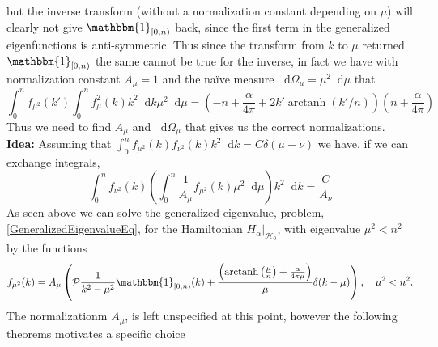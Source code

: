 \documentclass[a4paper,11pt]{article}
\DeclareMathOperator\arctanh{arctanh}
\newcommand*\diff{\mathop{}\!\mathrm{d}}
\numberwithin{equation}{section}
\begin{document}
	but the inverse transform (without a normalization constant depending on $ \mu $) will clearly not give $ \mathbbm{1}_{[0,n)} $ back, since the first term in the generalized eigenfunctions is anti-symmetric. Thus since the transform from $ k $ to $ \mu $ returned $ \mathbbm{1}_{[0,n)} $ the same cannot be true for the inverse, in fact we have with normalization constant $ A_\mu=1 $ and the na\"ive measure $ \diff\Omega_\mu=\mu^2\diff\mu $ that  \begin{equation}
	\int_{0}^{n}f_{\mu^2}(k')\int_{0}^{n}f_\mu^2(k) k^2\diff k\mu^2\diff\mu=\left(-n+\frac{\alpha}{4\pi}+2k'\arctanh(k'/n)\right)\left(n+\frac{\alpha}{4\pi}\right)
	\end{equation} 
	Thus we need to find $ A_\mu $ and $ \diff\Omega_\mu $ that gives us the correct normalizations.\\
	\textbf{Idea:} Assuming that $ \int_{0}^{n}f_{\mu^2}(k)f_{\nu^2}(k)k^2\diff k=C\delta(\mu-\nu) $ we have, if we can exchange integrals, \begin{equation}
	\int_{0}^{n} f_{\nu^2}(k) \left(\int_{0}^{n}\frac{1}{A_\mu}f_{\mu^2}(k)\mu^2\diff\mu\right)k^2\diff k=\frac{C}{A_\nu}
	\end{equation}
	As seen above we can solve the generalized eigenvalue, problem, \eqref{GeneralizedEigenvalueEq}, for the Hamiltonian $ H_\alpha\rvert_{\mathcal{H}_0} $, with eigenvalue $ \mu^2<n^2 $ by the functions\begin{equation}\label{EqGeneralizedEigenfunctions}
	f_{\mu^2}(k)=A_\mu\left(\mathcal{P}\frac{1}{k^2-\mu^2}\mathbbm{1}_{[0,n)}(k)+\frac{\left(\arctanh\left(\frac{\mu}{n}\right)+\frac{\alpha}{4\pi\mu}\right)}{\mu}\delta(k-\mu)\right),\quad \mu^2<n^2.
	\end{equation}
	The normalizationm $ A_\mu $, is left unspecified at this point, however the following theorems motivates a specific choice
\end{document}
